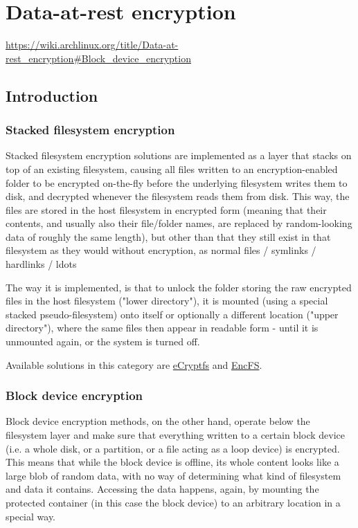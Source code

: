 \chapter{Data-at-rest encryption}
\url{https://wiki.archlinux.org/title/Data-at-rest_encryption#Block_device_encryption}
\section{Introduction}

\subsection{Stacked filesystem encryption}
Stacked filesystem encryption solutions are implemented as a layer that stacks
on top of an existing filesystem, causing all files written to an
encryption-enabled folder to be encrypted on-the-fly before the underlying
filesystem writes them to disk, and decrypted whenever the filesystem reads
them from disk. This way, the files are stored in the host filesystem in
encrypted form (meaning that their contents, and usually also their file/folder
names, are replaced by random-looking data of roughly the same length), but
other than that they still exist in that filesystem as they would without
encryption, as normal files / symlinks / hardlinks / ldots

The way it is implemented, is that to unlock the folder storing the raw
encrypted files in the host filesystem ("lower directory"), it is mounted
(using a special stacked pseudo-filesystem) onto itself or optionally a
different location ("upper directory"), where the same files then appear in
readable form - until it is unmounted again, or the system is turned off.

Available solutions in this category are
\href{https://wiki.archlinux.org/title/ECryptfs}{eCryptfs} and
\href{https://wiki.archlinux.org/title/EncFS}{EncFS}.

\subsection{Block device encryption}

Block device encryption methods, on the other hand, operate below the
filesystem layer and make sure that everything written to a certain block
device (i.e. a whole disk, or a partition, or a file acting as a loop device)
is encrypted. This means that while the block device is offline, its whole
content looks like a large blob of random data, with no way of determining what
kind of filesystem and data it contains. Accessing the data happens, again, by
mounting the protected container (in this case the block device) to an
arbitrary location in a special way.

